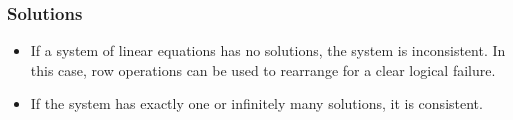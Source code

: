 \documentclass[12pt]{report}
\begin{document}
\begin{flushleft}
\subsubsection*{Solutions}

\begin{itemize}
  \item If a system of linear equations has no solutions, the system is
      inconsistent. In this case, row operations can be used to rearrange for a
      clear logical failure.
  \item If the system has exactly one or infinitely many solutions, it is
      consistent.
\end{itemize}


\end{flushleft}
\end{document}
